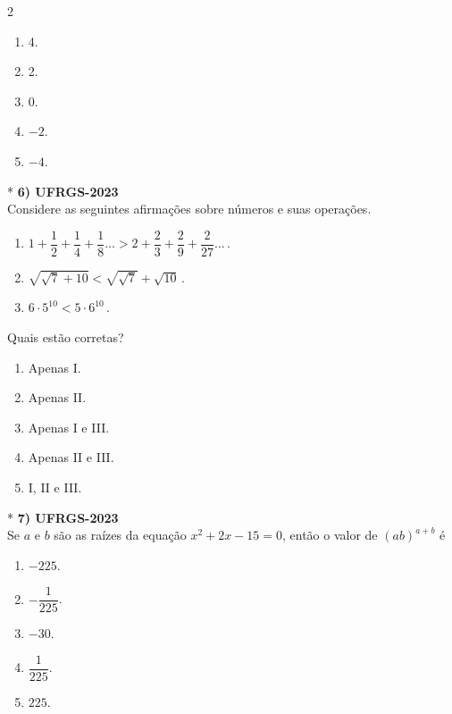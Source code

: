 \documentclass[11pt,a4paper]{article}
\begin{document}
\begin{paracol}{2}
\begin{enumerate}[label=(\Alph*)]
    \item 4.
    \item 2.
    \item 0.
    \item $-2$.
    \item $-4$.
\end{enumerate}
\vspace{0.4cm}

\switchcolumn[1]
\vspace{6cm}

\switchcolumn[0]*
\textbf{6) UFRGS-2023} \\
Considere as seguintes afirmações sobre números e suas operações.

\begin{enumerate}[label=\Roman*., itemsep=0.3cm]
    \item $1 + \dfrac{1}{2} + \dfrac{1}{4} + \dfrac{1}{8} \dots > 2 + \dfrac{2}{3} + \dfrac{2}{9} + \dfrac{2}{27} \dots \, .$
    \item $\sqrt{\sqrt{7} + 10} < \sqrt{\sqrt{7}} + \sqrt{10} \, .$
    \item $6 \cdot 5^{10} < 5 \cdot 6^{10} \, .$
\end{enumerate}

Quais estão corretas?

\begin{enumerate}[label=(\Alph*)]
    \item Apenas I.
    \item Apenas II.
    \item Apenas I e III.
    \item Apenas II e III.
    \item I, II e III.
\end{enumerate}
\vspace{0.4cm}

\switchcolumn[1]
\vspace{8cm} 

\switchcolumn[0]*
\textbf{7) UFRGS-2023} \\
Se $a$ e $b$ são as raízes da equação $x^2 + 2x - 15 = 0$, então o valor de $(ab)^{a+b}$ é

\begin{enumerate}[label=(\Alph*), itemsep=0.2cm]
    \item $-225$.
    \item $-\dfrac{1}{225}$.
    \item $-30$.
    \item $\dfrac{1}{225}$.
    \item $225$.
\end{enumerate}
\vspace{0.4cm}


\end{paracol}
\end{document}

